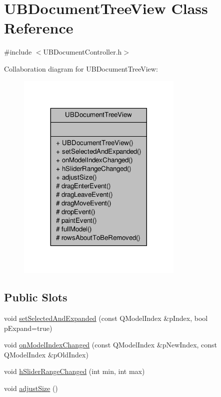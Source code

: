 \hypertarget{class_u_b_document_tree_view}{\section{U\-B\-Document\-Tree\-View Class Reference}
\label{da/d16/class_u_b_document_tree_view}
}


{\ttfamily \#include $<$U\-B\-Document\-Controller.\-h$>$}



Collaboration diagram for U\-B\-Document\-Tree\-View\-:
\nopagebreak
\begin{figure}[H]
\begin{center}
\leavevmode
\includegraphics[width=224pt]{d9/d1f/class_u_b_document_tree_view__coll__graph}
\end{center}
\end{figure}
\subsection*{Public Slots}
\begin{DoxyCompactItemize}
\item 
void \hyperlink{class_u_b_document_tree_view_ab603fd056fbd771f92b8e3008e745b78}{set\-Selected\-And\-Expanded} (const Q\-Model\-Index \&p\-Index, bool p\-Expand=true)
\item 
void \hyperlink{class_u_b_document_tree_view_ac4ae6d7b0e1c1fa635183133cb5a0069}{on\-Model\-Index\-Changed} (const Q\-Model\-Index \&p\-New\-Index, const Q\-Model\-Index \&p\-Old\-Index)
\item 
void \hyperlink{class_u_b_document_tree_view_ac9e847ad2b2e8fb7a12fab80a8eea1e8}{h\-Slider\-Range\-Changed} (int min, int max)
\item 
void \hyperlink{class_u_b_document_tree_view_a776f3ae88bf5cad79fdd6eec358bc0d0}{adjust\-Size} ()
\end{DoxyCompactItemize}
